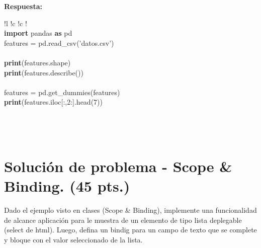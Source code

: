 \documentclass{exam}
\begin{document}
\textbf{Respuesta:}

\begin{table}[H]
\begin{tabular}{
    !{\color{gray!50}\vrule}l
    !{\color{gray!50}\vrule}c
    !{\color{gray!50}\vrule}c
    !{\color{gray!50}\vrule}} 
     \hline \\ 
    \textbf{import} pandas \textbf{as} pd \\
    features = pd.read\_csv('datos.csv') \\
    \\ 
    \textbf{print}(features.shape) \\
    \textbf{print}(features.describe()) \\
    \\
    features = pd.get\_dummies(features) \\
    \textbf{print}(features.iloc[:,2:].head(7)) \\
    \\
    ~~~~~~~~~~~~~~~~~~~~~~~~~~~~~~~~~~~~~~~~~~~~~~~~~~~~~~~~~~~~~~~~~~~~~~~~~~~~~~~~~~~~~~~~~~~~~~~~~~~~~~~~~~~~~~~~~~~~~~~~~~~~~~~~~~~~~~~~~~
     \\   \hline
\end{tabular}
\end{table}

\clearpage

\section{\textbf{Soluci\'on de problema - Scope \& Binding. (45 pts.)}}

\noindent
Dado el ejemplo visto en clases (Scope \& Binding), implemente una funcionalidad de alcance aplicaci\'on para le muestra de un elemento de tipo lista deplegable (select de html). Luego, defina un bindig para un campo de texto que se complete y bloque con el valor seleccionado de la lista.
\end{document}
